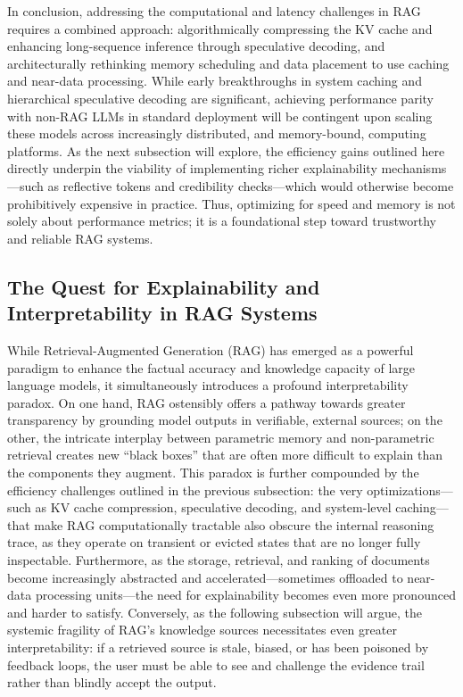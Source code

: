\documentclass[11pt]{article}
\begin{document}
In conclusion, addressing the computational and latency challenges in RAG requires a combined approach: algorithmically compressing the KV cache and enhancing long-sequence inference through speculative decoding, and architecturally rethinking memory scheduling and data placement to use caching and near-data processing. While early breakthroughs in system caching \cite{ref58} and hierarchical speculative decoding \cite{ref237} are significant, achieving performance parity with non-RAG LLMs in standard deployment will be contingent upon scaling these models across increasingly distributed, and memory-bound, computing platforms. As the next subsection will explore, the efficiency gains outlined here directly underpin the viability of implementing richer explainability mechanisms---such as reflective tokens and credibility checks---which would otherwise become prohibitively expensive in practice. Thus, optimizing for speed and memory is not solely about performance metrics; it is a foundational step toward trustworthy and reliable RAG systems.

\subsection{The Quest for Explainability and Interpretability in RAG Systems}

While Retrieval-Augmented Generation (RAG) has emerged as a powerful paradigm to enhance the factual accuracy and knowledge capacity of large language models, it simultaneously introduces a profound interpretability paradox. On one hand, RAG ostensibly offers a pathway towards greater transparency by grounding model outputs in verifiable, external sources; on the other, the intricate interplay between parametric memory and non-parametric retrieval creates new ``black boxes'' that are often more difficult to explain than the components they augment. This paradox is further compounded by the efficiency challenges outlined in the previous subsection: the very optimizations---such as KV cache compression, speculative decoding, and system-level caching---that make RAG computationally tractable also obscure the internal reasoning trace, as they operate on transient or evicted states that are no longer fully inspectable. Furthermore, as the storage, retrieval, and ranking of documents become increasingly abstracted and accelerated---sometimes offloaded to near-data processing units---the need for explainability becomes even more pronounced and harder to satisfy. Conversely, as the following subsection will argue, the systemic fragility of RAG's knowledge sources necessitates even greater interpretability: if a retrieved source is stale, biased, or has been poisoned by feedback loops, the user must be able to see and challenge the evidence trail rather than blindly accept the output.
\end{document}
